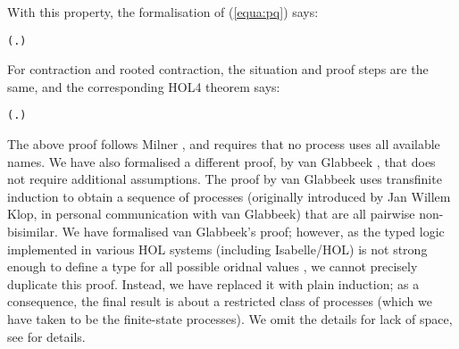 With this property, the formalisation of (\ref{equa:pq}) says:
\begin{alltt}
\HOLTokenTurnstile{}   \HOLSymConst{\HOLTokenConj{}}   \HOLSymConst{\HOLTokenImp{}} (\HOLSymConst{\HOLTokenForall{}}.  \HOLSymConst{+}  \HOLSymConst{\HOLTokenWeakEQ}  \HOLSymConst{+} ) \HOLSymConst{\HOLTokenImp{}}  \HOLSymConst{\HOLTokenObsCongr} 
\end{alltt}

For contraction and rooted contraction, the situation and proof
steps are the same, and the corresponding HOL4 theorem says:
\begin{alltt}
\HOLTokenTurnstile{}   \HOLSymConst{\HOLTokenConj{}}   \HOLSymConst{\HOLTokenImp{}} (\HOLSymConst{\HOLTokenForall{}}.  \HOLSymConst{+}  \HOLSymConst{\HOLTokenContracts{}}  \HOLSymConst{+} ) \HOLSymConst{\HOLTokenImp{}}  \HOLSymConst{\HOLTokenObsContracts} 
\end{alltt}

The above proof follows 
Milner \cite{Mil89}, and requires
 that no process uses all available names. 
We have also formalised a different proof, 
by
 van Glabbeek
 \cite{vanGlabbeek:2005ur}, that does not require additional
 assumptions. 
The proof by van Glabbeek uses transfinite induction to obtain 
a sequence of processes (originally introduced by Jan Willem Klop, in
personal communication with van Glabbeek)
 that are all pairwise non-bisimilar. 
We have formalised van Glabbeek's proof; however, as the typed logic
implemented in various HOL systems (including Isabelle/HOL) is not
strong enough to define a type for all possible oridnal values \cite{norrish2013ordinals}, we
cannot precisely duplicate this proof. Instead,
we have replaced it with plain induction; as a consequence, the final
result is about a restricted class of processes (which we have taken
to be the finite-state processes). We omit the details for lack of
space, see \cite{Tian:2017wrba} for details. 
